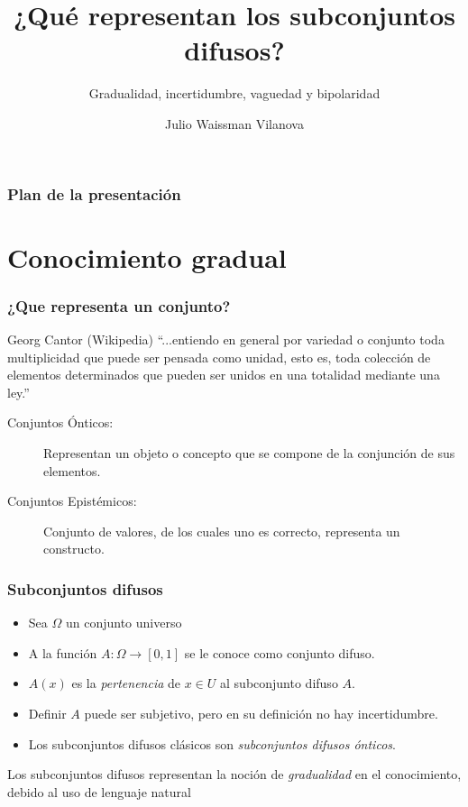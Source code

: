\documentclass{beamer}
\title[] %
{¿Qué representan los subconjuntos difusos?}
\subtitle{Gradualidad, incertidumbre, vaguedad y bipolaridad}
\author[Waissman]{Julio Waissman Vilanova}
\institute[UNISON] %
{Departamento de Matem\'aticas\\
 \textbf{Universidad de Sonora}}
\theoremstyle{definition}
\begin{document}
\begin{frame}
  \titlepage
\end{frame}

\begin{frame}
  \frametitle{Plan de la presentación}
  \tableofcontents
\end{frame}


\section{Conocimiento gradual}

\begin{frame}
  \frametitle{¿Que representa un conjunto?}
   \begin{block}{Georg Cantor (Wikipedia)}
      ``...entiendo en general por variedad o \alert{conjunto} toda
      multiplicidad que puede ser pensada como unidad, esto es, toda
      colección de elementos determinados que pueden ser unidos en una
      totalidad mediante una ley.''
   \end{block}
   \vspace{1cm}
   \begin{description}
   \item[Conjuntos Ónticos:] Representan un objeto  o concepto que se
     compone de la conjunción de sus elementos.
   \item[Conjuntos Epistémicos:] Conjunto de valores, de los cuales
     uno es correcto, representa un constructo.  
   \end{description}
  
\end{frame}

\begin{frame}
  \frametitle{Subconjuntos difusos}
  \begin{itemize}
  \item Sea $\Omega$ un conjunto universo
  \item A la función $A: \Omega \to [0, 1]$ se le conoce como conjunto
    difuso.
  \item $A(x)$ es la \emph{pertenencia} de $x \in U$ al subconjunto
    difuso $A$.
  \item Definir $A$ puede ser subjetivo, pero en su definición no hay
    incertidumbre. 
  \item Los subconjuntos difusos clásicos son \emph{subconjuntos
      difusos ónticos}. 
  \end{itemize}

  \begin{center}
    \alert{Los subconjuntos difusos representan la noción de
      \emph{gradualidad} en el conocimiento, debido al uso de lenguaje natural}
  \end{center}
\end{frame}
\end{document}
